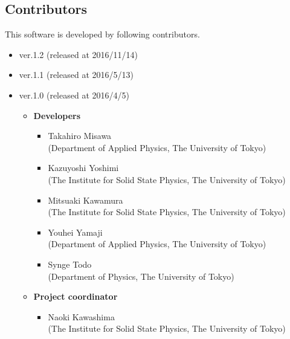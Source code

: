 \subsection{Contributors}
\label{subsec:contributors}
This software is developed by following contributors.
\begin{itemize}
\item{ver.1.2 (released at 2016/11/14)}
\item{ver.1.1 (released at 2016/5/13)}
\item{ver.1.0 (released at 2016/4/5)}
\begin{itemize}
	\item{\bf Developers}
	\begin{itemize}
	\item{Takahiro Misawa \\(Department of Applied Physics, The University of Tokyo)}
	\item{Kazuyoshi Yoshimi\\ (The Institute for Solid State Physics, The University of Tokyo)}
	\item{Mitsuaki Kawamura\\ (The Institute for Solid State Physics, The University of Tokyo)}
	\item{Youhei Yamaji\\ (Department of Applied Physics, The University of Tokyo)}
	\item{Synge Todo\\ (Department of Physics, The University of Tokyo)}
	\end{itemize}
	\item{\bf Project coordinator}
	\begin{itemize}
	\item{Naoki Kawashima\\ (The Institute for Solid State Physics, The University of Tokyo)}
	\end{itemize}
\end{itemize}


\end{itemize}
